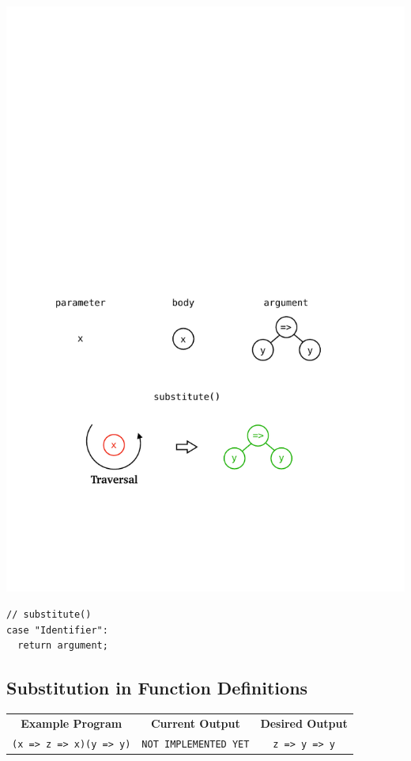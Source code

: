 \documentclass[12pt, oneside]{book}
\begin{document}
\begin{center}
\includegraphics{images/a-call-involving-immediate-functions.pdf}
\end{center}

\begin{verbatim}
// substitute()
case "Identifier":
  return argument;
\end{verbatim}

\subsection{Substitution in Function Definitions}
\label{Substitution in Function Definitions}

\begin{center}
\begin{tabular}{c|c|c}
\textbf{Example Program} & \textbf{Current Output} & \textbf{Desired Output} \\
\texttt{(x => z => x)(y => y)} & \texttt{NOT IMPLEMENTED YET} & \texttt{z => y => y} \\
\end{tabular}
\end{center}
\end{document}
